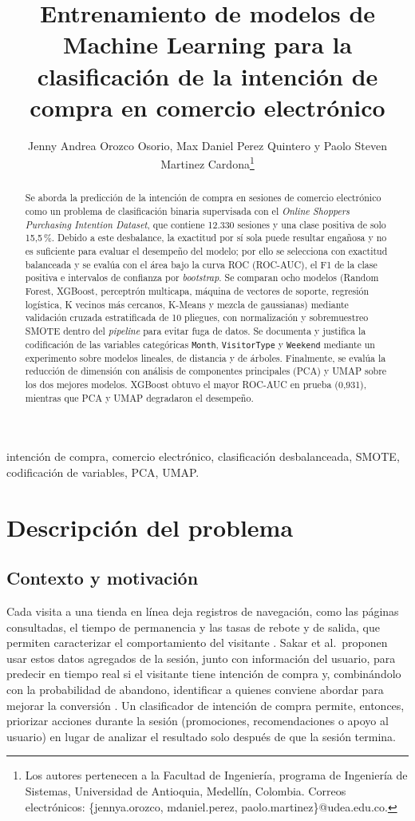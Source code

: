 \documentclass[conference]{IEEEtran}
\title{Entrenamiento de modelos de Machine Learning para la clasificación de la intención de compra en comercio electrónico}
\author{Jenny Andrea Orozco Osorio, Max Daniel Perez Quintero y Paolo Steven Martinez Cardona\thanks{Los autores pertenecen a la Facultad de Ingeniería, programa de Ingeniería de Sistemas, Universidad de Antioquia, Medellín, Colombia. Correos electrónicos: \{jennya.orozco, mdaniel.perez, paolo.martinez\}@udea.edu.co.}}
\begin{document}
\maketitle

\begin{abstract}
Se aborda la predicción de la intención de compra en sesiones de comercio electrónico como un problema de clasificación binaria supervisada con el \emph{Online Shoppers Purchasing Intention Dataset}, que contiene 12.330 sesiones y una clase positiva de solo 15,5\,\%. Debido a este desbalance, la exactitud por sí sola puede resultar engañosa y no es suficiente para evaluar el desempeño del modelo; por ello se selecciona con exactitud balanceada y se evalúa con el área bajo la curva ROC (ROC-AUC), el F1 de la clase positiva e intervalos de confianza por \emph{bootstrap}. Se comparan ocho modelos (Random Forest, XGBoost, perceptrón multicapa, máquina de vectores de soporte, regresión logística, K vecinos más cercanos, K-Means y mezcla de gaussianas) mediante validación cruzada estratificada de 10 pliegues, con normalización y sobremuestreo SMOTE dentro del \emph{pipeline} para evitar fuga de datos. Se documenta y justifica la codificación de las variables categóricas \texttt{Month}, \texttt{VisitorType} y \texttt{Weekend} mediante un experimento sobre modelos lineales, de distancia y de árboles. Finalmente, se evalúa la reducción de dimensión con análisis de componentes principales (PCA) y UMAP sobre los dos mejores modelos. XGBoost obtuvo el mayor ROC-AUC en prueba (0,931), mientras que PCA y UMAP degradaron el desempeño.
\end{abstract}

\begin{IEEEkeywords}
intención de compra, comercio electrónico, clasificación desbalanceada, SMOTE, codificación de variables, PCA, UMAP.
\end{IEEEkeywords}

\section{Descripción del problema}

\subsection{Contexto y motivación}
Cada visita a una tienda en línea deja registros de navegación, como las páginas consultadas, el tiempo de permanencia y las tasas de rebote y de salida, que permiten caracterizar el comportamiento del visitante \cite{sakar2019}. Sakar et al.\ proponen usar estos datos agregados de la sesión, junto con información del usuario, para predecir en tiempo real si el visitante tiene intención de compra y, combinándolo con la probabilidad de abandono, identificar a quienes conviene abordar para mejorar la conversión \cite{sakar2019}. Un clasificador de intención de compra permite, entonces, priorizar acciones durante la sesión (promociones, recomendaciones o apoyo al usuario) en lugar de analizar el resultado solo después de que la sesión termina.
\end{document}
